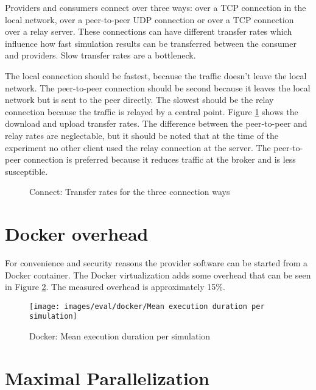 Providers and consumers connect over three ways: over a TCP connection in the local network, over a peer-to-peer UDP connection or over a TCP connection over a relay server. These connections can have different transfer rates which influence how fast simulation results can be transferred between the consumer and providers. Slow transfer rates are a bottleneck.

The local connection should be fastest, because the traffic doesn't leave the local network. The peer-to-peer connection should be second because it leaves the local network but is sent to the peer directly. The slowest should be the relay connection because the traffic is relayed by a central point. Figure \ref{fig:eval-connect-transfer} shows the download and upload transfer rates. The difference between the peer-to-peer and relay rates are neglectable, but it should be noted that at the time of the experiment no other client used the relay connection at the server. The peer-to-peer connection is preferred because it reduces traffic at the broker and is less susceptible.

\begin{figure}[h]
  \centering
  
  \caption{Connect: Transfer rates for the three connection ways}
  \label{fig:eval-connect-transfer}
\end{figure}

\section{Docker overhead}

For convenience and security reasons the provider software can be started from a Docker container. The Docker virtualization adds some overhead that can be seen in Figure \ref{fig:eval-docker-sim-run}. The measured overhead is approximately 15\%.

\begin{figure}[h]
  \centering
  \texttt{[image: images/eval/docker/Mean execution duration per simulation]}
  \caption{Docker: Mean execution duration per simulation}
  \label{fig:eval-docker-sim-run}
\end{figure}




\section{Maximal Parallelization}

